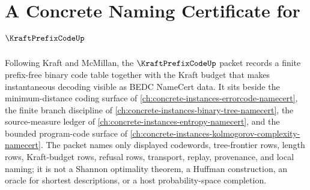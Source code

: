 \chapter{A Concrete Naming Certificate for $\KraftPrefixCodeUp$}
\label{ch:concrete-instances-kraft-prefix-code-namecert}

Following Kraft and McMillan, the $\KraftPrefixCodeUp$ packet records a finite prefix-free binary code table together with the Kraft budget that makes instantaneous decoding visible as BEDC NameCert data. It sits beside the minimum-distance coding surface of \autoref{ch:concrete-instances-errorcode-namecert}, the finite branch discipline of \autoref{ch:concrete-instances-binary-tree-namecert}, the source-measure ledger of \autoref{ch:concrete-instances-entropy-namecert}, and the bounded program-code surface of \autoref{ch:concrete-instances-kolmogorov-complexity-namecert}. The packet names only displayed codewords, tree-frontier rows, length rows, Kraft-budget rows, refusal rows, transport, replay, provenance, and local naming; it is not a Shannon optimality theorem, a Huffman construction, an oracle for shortest descriptions, or a host probability-space completion.

